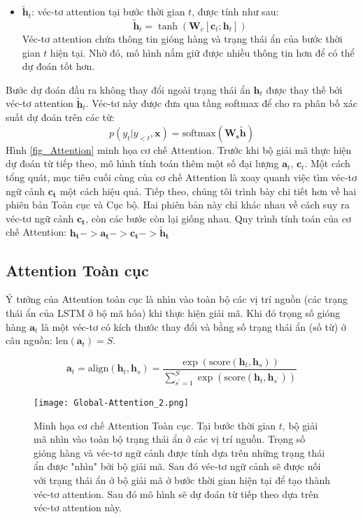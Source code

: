 \begin{itemize}
	\item $\bm{\tilde{h}}_t$: véc-tơ attention tại bước thời gian $t$, được tính như sau:
	\begin{equation}
	\boldsymbol{\tilde{h}}_t = \tanh(\bm{W}_c[\bm{c}_t;\bm{h}_t])
	\end{equation}
	Véc-tơ attention chứa thông tin gióng hàng và trạng thái ẩn của bước thời gian $t$ hiện tại. Nhờ đó, mô hình nắm giữ được nhiều thông tin hơn để có thể dự đoán tốt hơn.
\end{itemize}
Bước dự đoán đầu ra không thay đổi ngoài trạng thái ẩn $\bm{h}_t$ được thay thế bởi véc-tơ attention $\bm{\tilde{h}}_t$. Véc-tơ này được đưa qua tầng softmax để cho ra phân bố xác suất dự đoán trên các từ:
\begin{equation}
p(y_t | y_{<t}, \bm{x}) = \text{softmax}(\bm{W_s\tilde{h}})
\end{equation}
Hình \ref{fig_Attention} minh họa cơ chế Attention. Trước khi bộ giải mã thực hiện dự đoán từ tiếp theo, mô hình tính toán thêm một số đại lượng $\bm{a}_t$, $\bm{c}_t$. Một cách tổng quát, mục tiêu cuối cùng của cơ chế Attention là xoay quanh việc tìm véc-tơ ngữ cảnh $\bm{c_t}$ một cách hiệu quả.
Tiếp theo, chúng tôi trình bày chi tiết hơn về hai phiên bản Toàn cục và Cục bộ. Hai phiên bản này chỉ khác nhau về cách suy ra véc-tơ ngữ cảnh $\bm{c_t}$, còn các bước còn lại giống nhau.
Quy trình tính toán của cơ chế Attention: $\bm{h_t} -> \bm{a_t} -> \bm{c_t} -> \bm{\tilde{h}_t}$
\subsection{Attention Toàn cục}
Ý tưởng của Attention toàn cục là nhìn vào toàn bộ các vị trí nguồn (các trạng thái ẩn của LSTM ở bộ mã hóa) khi thực hiện giải mã.
Khi đó trọng số gióng hàng $\bm{a}_t$ là một véc-tơ có kích thước thay đổi và bằng số trạng thái ẩn (số từ) ở câu nguồn: $\text{len}(\bm{a}_t) = S$.

\begin{equation}
\bm{a}_t = \text{align}(\bm{h}_t, \bm{h}_s) = \frac{\exp\left(\text{score}(\bm{h}_t, \bm{h}_s)\right)}{\sum^{S}_{s^{'}=1}\exp\left(\text{score}(\bm{h}_t, \bm{h}_{s^{'}})\right)}
\end{equation}

\begin{figure}
	\centering
	\texttt{[image: Global-Attention\_2.png]}
	\caption[Minh họa cơ chế Attention Toàn cục.]{Minh họa cơ chế Attention Toàn cục. Tại bước thời gian $t$, bộ giải mã nhìn vào toàn bộ trạng thái ẩn ở các vị trí nguồn. Trọng số gióng hàng và véc-tơ ngữ cảnh được tính dựa trên những trạng thái ẩn được "nhìn" bởi bộ giải mã. Sau đó véc-tơ ngữ cảnh sẽ được nối với trạng thái ẩn ở bộ giải mã ở bước thời gian hiện tại để tạo thành véc-tơ attention. Sau đó mô hình sẽ dự đoán từ tiếp theo dựa trên véc-tơ attention này.}
	\label{fig_Global_Attention}
\end{figure}

